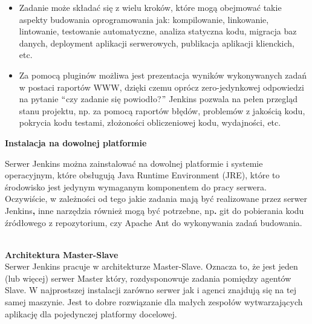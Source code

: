 \documentclass[12pt]{article}
\renewcommand{\_}{\kern-1.5pt\textunderscore\kern-1.5pt}
\begin{document}
\begin{itemize}
\begin{itemize}
\begin{itemize}
	\item Zadanie może składać się z wielu kroków, które mogą obejmować takie aspekty budowania oprogramowania jak: kompilowanie, linkowanie, lintowanie, testowanie automatyczne, analiza statyczna kodu, migracja baz danych, deployment aplikacji serwerowych, publikacja aplikacji klienckich, etc.\par

	\item Za pomocą pluginów możliwa jest prezentacja wyników wykonywanych zadań w postaci raportów WWW, dzięki czemu oprócz zero-jedynkowej odpowiedzi na pytanie $``$czy zadanie się powiodło?$"$  Jenkins pozwala na pełen przegląd stanu projektu, np. za pomocą raportów błędów, problemów z jakością kodu, pokrycia kodu testami, złożoności obliczeniowej kodu, wydajności, etc.\\

\end{itemize}
\end{itemize}
\end{itemize}\par

\begin{adjustwidth}{0.5in}{0.0in}
\textbf{Instalacja na dowolnej platformie}\par

\end{adjustwidth}

\begin{adjustwidth}{1.0in}{0.0in}
Serwer Jenkins można zainstalować na dowolnej platformie i systemie operacyjnym, które obsługują Java Runtime Environment (JRE), które to środowisko jest jedynym wymaganym komponentem do pracy serwera. Oczywiście, w zależności od tego jakie zadania mają być realizowane przez serwer Jenkins\textbf{, }inne narzędzia również mogą być potrzebne, np\textbf{. }git do pobierania kodu źródłowego z repozytorium, czy Apache Ant do wykonywania zadań budowania.\par

\end{adjustwidth}

\\
\tab \textbf{Architektura Master-Slave\\
\tab }Serwer Jenkins pracuje w architekturze Master-Slave. Oznacza to, że jest \tab jeden (lub więcej) serwer Master który, rozdysponowuje zadania pomiędzy \tab agentów Slave. W najprostszej instalacji zarówno serwer jak i agenci \tab znajdują się na tej samej maszynie. Jest to dobre rozwiązanie dla małych \tab zespołów wytwarzających aplikację dla pojedynczej platformy docelowej.\par
\end{document}
